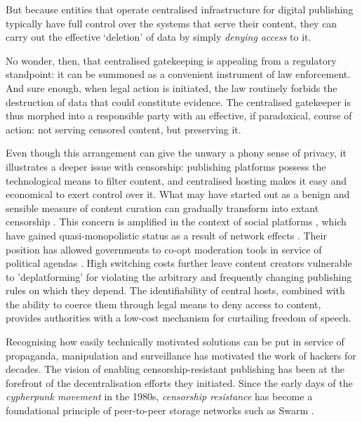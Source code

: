 \documentclass[singlecolumn]{acmart}
\begin{document}
But because entities that operate centralised infrastructure for digital publishing typically have full control over the systems that serve their content, they can carry out the effective `deletion' of data by simply \emph{denying access} to it. 

No wonder, then, that centralised gatekeeping is appealing from a regulatory standpoint: it can be summoned as a convenient instrument of law enforcement. And sure enough, when legal action is initiated, the law routinely forbids the destruction of data that could constitute evidence. The centralised gatekeeper is thus morphed into a responsible party with an effective, if paradoxical, course of action: not serving censored content, but preserving it.

Even though this arrangement can give the unwary a phony sense of privacy, it illustrates a deeper issue with censorship: publishing platforms possess the technological means to filter content, and centralised hosting makes it easy and economical to exert control over it. What may have started out as a benign and sensible measure of content curation can gradually transform into extant censorship \cite{chaum2021informationage,gillespie2018custodians}. This concern is amplified in the context of social platforms \cite{barnett2019platforms,klonick2018newgovernors}, which have gained quasi-monopolistic status as a result of network effects \cite{zuckerman2014newcensorship}. Their position has allowed governments to co-opt moderation tools in service of political agendas \cite{facebook2023pressure}. High switching costs further leave content creators vulnerable to 'deplatforming' \cite{zhang2021deplatforming} for violating the arbitrary and frequently changing publishing rules on which they depend. The identifiability of central hosts, combined with the ability to coerce them through legal means to deny access to content, provides authorities with a low-cost mechanism for curtailing freedom of speech. 

Recognising how easily technically motivated solutions can be put in service of propaganda, manipulation and surveillance has motivated the work of hackers for decades. The vision of enabling censorship-resistant publishing has been at the forefront of the decentralisation efforts they initiated. Since  the early days of the \emph{cypherpunk movement} in the 1980s, \emph{censorship resistance} has become a foundational principle of peer-to-peer storage networks such as Swarm \cite{swarm2021whitepaper}.
\end{document}

